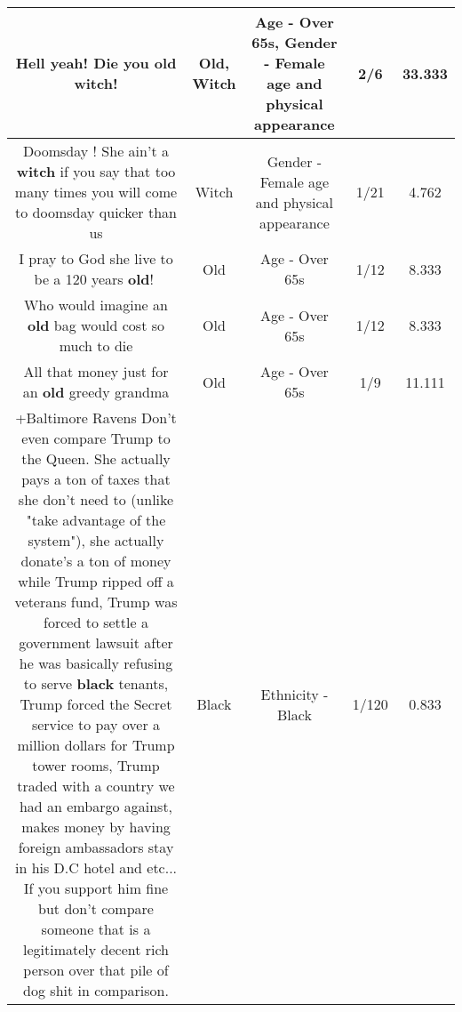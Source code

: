 \documentclass[11pt]{article}
\newlength\mylength
\begin{document}
\begin{center}
\begin{longtable}{|C{.65\mylength}|C{.30\mylength}|C{.12\mylength}|C{.12\mylength}|C{.12\mylength}|}
  \small Hell yeah! Die you \textbf{old} \textbf{witch}!\normalsize   & Old, Witch & Age - Over 65s, Gender - Female age and physical appearance & 2/6 & 33.333 \\  \hline
  \small Doomsday ! She ain't a \textbf{witch} if you say that too many times you will come to doomsday quicker than us\normalsize   & Witch & Gender - Female age and physical appearance & 1/21 & 4.762 \\  \hline
  \small I pray to God she live to be a 120 years \textbf{old}!🙏\normalsize   & Old & Age - Over 65s & 1/12 & 8.333 \\  \hline
  \small Who would imagine an \textbf{old} bag would cost so much to die\normalsize   & Old & Age - Over 65s & 1/12 & 8.333 \\  \hline
  \small All that money just for an \textbf{old} greedy grandma\normalsize   & Old & Age - Over 65s & 1/9 & 11.111 \\  \hline
  \small +Baltimore Ravens Don't even compare Trump to the Queen. She actually pays a ton of taxes that she don't need to (unlike "take advantage of the system"), she actually donate's a ton of money while Trump ripped off a veterans fund, Trump was forced to settle a government lawsuit after he was basically refusing to serve \textbf{black} tenants, Trump forced the Secret service to pay over a million dollars for Trump tower rooms, Trump traded with a country we had an embargo against, makes money by having foreign ambassadors stay in his D.C hotel and etc... If you support him fine but don't compare someone that is a legitimately decent rich person over that pile of dog shit in comparison.\normalsize   & Black & Ethnicity - Black & 1/120 & 0.833 \\  \hline

\end{longtable}
\end{center}
\end{document}
